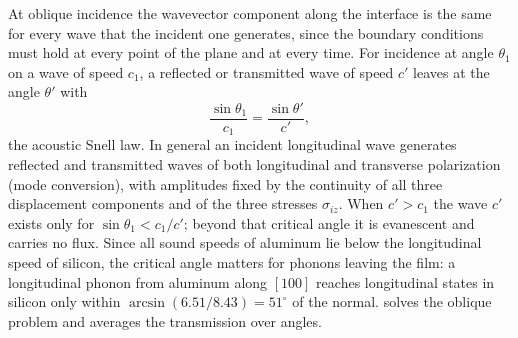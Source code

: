 At oblique incidence the wavevector component along the interface is the same for every wave that the incident one generates, since the boundary conditions must hold at every point of the plane and at every time. For incidence at angle $\theta_1$ on a wave of speed $c_1$, a reflected or transmitted wave of speed $c'$ leaves at the angle $\theta'$ with
\begin{equation}
  \frac{\sin\theta_1}{c_1} = \frac{\sin\theta'}{c'} ,
  \label{eq:C.18-snell}
\end{equation}
the acoustic Snell law. In general an incident longitudinal wave generates reflected and transmitted waves of both longitudinal and transverse polarization (mode conversion), with amplitudes fixed by the continuity of all three displacement components and of the three stresses $\sigma_{iz}$. When $c' > c_1$ the wave $c'$ exists only for $\sin\theta_1 < c_1/c'$; beyond that critical angle it is evanescent and carries no flux. Since all sound speeds of aluminum lie below the longitudinal speed of silicon, the critical angle matters for phonons leaving the film: a longitudinal phonon from aluminum along $[100]$ reaches longitudinal states in silicon only within $\arcsin(6.51/8.43) = 51^\circ$ of the normal.  solves the oblique problem and averages the transmission over angles.
